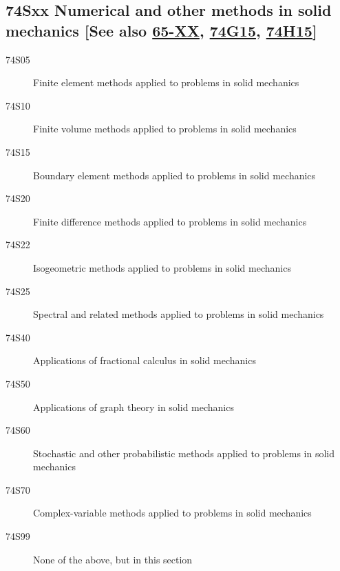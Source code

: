 \documentclass[letterpaper]{article}
\begin{document}
\subsection*{74Sxx  Numerical and other methods in solid mechanics [See also \hyperref[65-XX]{65-XX}, \hyperref[74G15]{74G15}, \hyperref[74H15]{74H15}] }\label{74Sxx}
\begin{description}  
\item [74S05]\label{74S05} Finite element methods applied to problems in solid mechanics
\item [74S10]\label{74S10} Finite volume methods applied to problems in solid mechanics
\item [74S15]\label{74S15} Boundary element methods applied to problems in solid mechanics
\item [74S20]\label{74S20} Finite difference methods applied to problems in solid mechanics
\item [74S22]\label{74S22} Isogeometric methods applied to problems in solid mechanics
\item [74S25]\label{74S25} Spectral and related methods applied to problems in solid mechanics
\item [74S40]\label{74S40} Applications of fractional calculus in solid mechanics
\item [74S50]\label{74S50} Applications of graph theory in solid mechanics
\item [74S60]\label{74S60} Stochastic and other probabilistic methods applied to problems in solid mechanics 
\item [74S70]\label{74S70} Complex-variable methods applied to problems in solid mechanics
\item [74S99]\label{74S99} None of the above, but in this section
\end{description}
\end{document}
